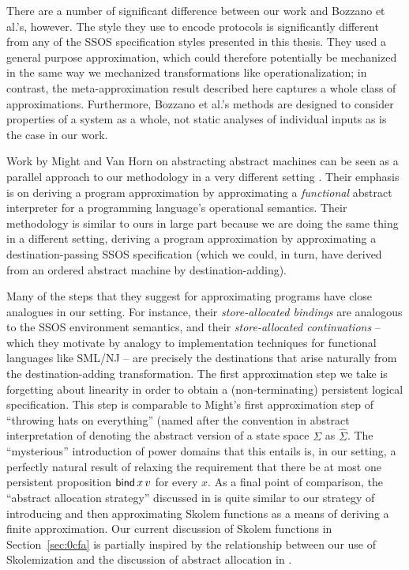 There are a number of significant difference between our work and
Bozzano et al.'s, however. The style they use to encode protocols is
significantly different from any of the SSOS specification styles
presented in this thesis. They used a general purpose approximation,
which could therefore potentially be mechanized in the same way we
mechanized transformations like operationalization; in contrast, the
meta-approximation result described here captures a whole class of
approximations. Furthermore, Bozzano et al.'s methods are designed to
consider properties of a system as a whole, not static analyses of
individual inputs as is the case in our work.

Work by Might and Van Horn on abstracting abstract machines can be
seen as a parallel approach to our methodology in a very different
setting
\cite{might10resolving,might10abstract,might10abstracting}. Their
emphasis is on deriving a program approximation by approximating a
{\it functional} abstract interpreter for a programming language's
operational semantics. Their methodology is similar to ours in large
part because we are doing the same thing in a different setting,
deriving a program approximation by approximating a
destination-passing SSOS specification (which we could, in turn, have
derived from an ordered abstract machine by destination-adding).

Many of the steps that they suggest for approximating programs have
close analogues in our setting. For instance, their {\it
  store-allocated bindings} are analogous to the SSOS environment
semantics, and their {\it store-allocated continuations} -- which they
motivate by analogy to implementation techniques for functional
languages like SML/NJ -- are precisely the destinations that arise
naturally from the destination-adding transformation. The first
approximation step we take is forgetting about linearity in order to
obtain a (non-terminating) persistent logical specification. This step
is comparable to Might's first approximation step of ``throwing hats
on everything'' (named after the convention in abstract interpretation
of denoting the abstract version of a state space $\Sigma$ as
$\hat{\Sigma}$. The ``mysterious'' introduction of power domains that
this entails is, in our setting, a perfectly natural result of
relaxing the requirement that there be at most one persistent
proposition ${\sf bind}\,x\,v$ for every $x$. As a final point of
comparison, the ``abstract allocation strategy'' discussed in
\cite{might10abstracting} is quite similar to our strategy of
introducing and then approximating Skolem functions as a means of
deriving a finite approximation. Our current discussion of Skolem
functions in Section~\ref{sec:0cfa} is partially inspired by the
relationship between our use of Skolemization and the discussion of
abstract allocation in \cite{might10abstracting}.

